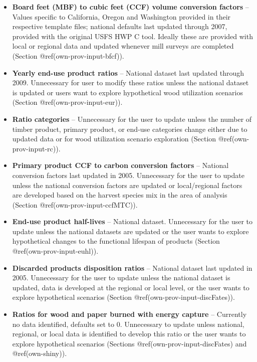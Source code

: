 \documentclass[
  openany]{book}
\begin{document}
\begin{itemize}
\item
  \textbf{Board feet (MBF) to cubic feet (CCF) volume conversion
  factors} -- Values specific to California, Oregon and Washington
  provided in their respective template files; national defaults last
  updated through 2007, provided with the original USFS HWP C tool.
  Ideally these are provided with local or regional data and updated
  whenever mill surveys are completed (Section
  @ref(own-prov-input-bfcf)).
\item
  \textbf{Yearly end-use product ratios} -- National dataset last
  updated through 2009. Unnecessary for user to modify these ratios
  unless the national dataset is updated or users want to explore
  hypothetical wood utilization scenarios (Section
  @ref(own-prov-input-eur)).
\item
  \textbf{Ratio categories} -- Unnecessary for the user to update unless
  the number of timber product, primary product, or end-use categories
  change either due to updated data or for wood utilization scenario
  exploration (Section @ref(own-prov-input-rc)).
\item
  \textbf{Primary product CCF to carbon conversion factors} -- National
  conversion factors last updated in 2005. Unnecessary for the user to
  update unless the national conversion factors are updated or
  local/regional factors are developed based on the harvest species mix
  in the area of analysis (Section @ref(own-prov-input-ccfMTC)).
\item
  \textbf{End-use product half-lives} -- National dataset. Unnecessary
  for the user to update unless the national datasets are updated or the
  user wants to explore hypothetical changes to the functional lifespan
  of products (Section @ref(own-prov-input-euhl)).
\item
  \textbf{Discarded products disposition ratios} -- National dataset
  last updated in 2005. Unnecessary for the user to update unless the
  national dataset is updated, data is developed at the regional or
  local level, or the user wants to explore hypothetical scenarios
  (Section @ref(own-prov-input-discFates)).
\item
  \textbf{Ratios for wood and paper burned with energy capture} --
  Currently no data identified, defaults set to 0. Unnecessary to update
  unless national, regional, or local data is identified to develop this
  ratio or the user wants to explore hypothetical scenarios (Sections
  @ref(own-prov-input-discFates) and @ref(own-shiny)).

\end{itemize}
\end{document}
